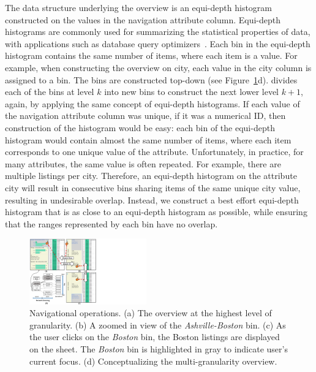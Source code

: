 The data structure underlying the overview
is an equi-depth histogram constructed
on the values
in the navigation attribute column.
Equi-depth histograms are commonly
used for summarizing the statistical properties
of data, with applications such as
database query optimizers~\cite{chaudhuri1998random}.
Each bin in the equi-depth histogram
contains the same number of items,
where each item is a value.
For example,
when constructing the overview
on city,
each value in the city column
is assigned to a bin.
The bins are constructed top-down
(see Figure~\ref{fig:concept}d). \noah divides
each of the bins at level $k$ into new bins
to construct the next lower level $k+1$, again,
by applying the same concept of equi-depth histograms.
If each value of the navigation attribute
column was unique, \eg if it was a numerical ID,
then construction of the histogram would be easy:
each bin of the equi-depth histogram
would contain almost the same number of items,
where each item corresponds to one unique value of
the attribute.
Unfortunately, in practice, for many attributes,
the same value is often repeated.
For example,
there are multiple listings
per city.
Therefore,
an equi-depth histogram
on the
attribute city
will result in consecutive bins
sharing items of
the same unique city value,
resulting in undesirable overlap.
Instead,
we construct a best effort
equi-depth
histogram that is as close to an equi-depth
histogram as possible, while ensuring
that the ranges represented by each bin have no overlap.

\begin{figure}[t]
        \centering
        \includegraphics[width=0.45\textwidth,trim={0 0 400 0},clip]{images/navigationOp.pdf}
\vspace{-10pt}
   \caption{Navigational operations. (a) The overview at the highest level of granularity. (b) A zoomed in view of the \emph{Ashville-Boston} bin. (c) As the user clicks on the \emph{Boston} bin, the Boston listings are displayed on the sheet. The \emph{Boston} bin is highlighted in gray to indicate user’s current focus. (d) Conceptualizing the multi-granularity overview. }
\vspace{-18pt}
   \label{fig:concept}
 \end{figure}

